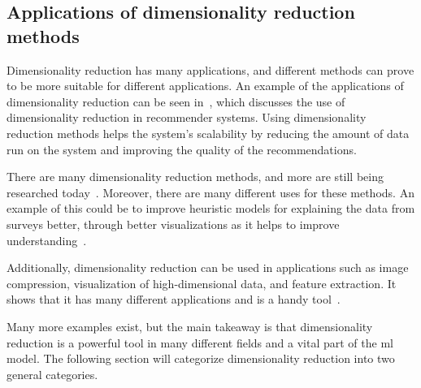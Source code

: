 \subsection{Applications of dimensionality reduction methods}

Dimensionality reduction has many applications, and different methods can prove to be more suitable for different applications. An example of the applications of dimensionality reduction can be seen in~\cite{sarwar2000application}, which discusses the use of dimensionality reduction in recommender systems. Using dimensionality reduction methods helps the system's scalability by reducing the amount of data run on the system and improving the quality of the recommendations.

There are many dimensionality reduction methods, and more are still being researched today~\cite{dimensionality-reduction-cheng}. Moreover, there are many different uses for these methods. An example of this could be to improve heuristic models for explaining the data from surveys better, through better visualizations as it helps to improve understanding~\cite{dimensionality-reduction-cheng}.

Additionally, dimensionality reduction can be used in applications such as image compression, visualization of high-dimensional data, and feature extraction. It shows that it has many different applications and is a handy tool~\cite{sarwar2000application}.

Many more examples exist, but the main takeaway is that dimensionality reduction is a powerful tool in many different fields and a vital part of the \gls{ml} model. The following section will categorize dimensionality reduction into two general categories.